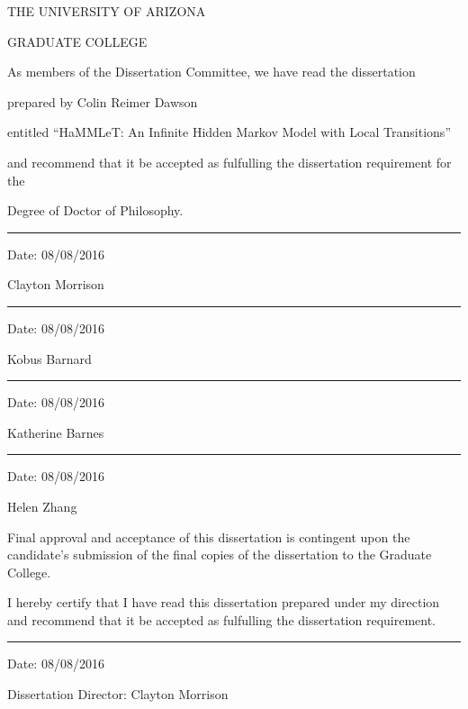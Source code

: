 \begin{center}
\MakeUppercase{The University of Arizona}

\MakeUppercase{Graduate College}

\end{center}

\begin{flushleft}
\begin{singlespace}
As members of the Dissertation Committee, we have read the dissertation

\vspace{0.25in}

prepared by Colin Reimer Dawson

\vspace{0.25in}

entitled ``HaMMLeT: An Infinite Hidden Markov Model with Local Transitions''

\vspace{0.25in}

and recommend that it be accepted as fulfulling the dissertation requirement for the

\vspace{0.25in}

Degree of Doctor of Philosophy.

\vspace{0.25in}

\rule{4in}{1pt} Date: 08/08/2016

Clayton Morrison

\vspace{0.25in}

\rule{4in}{1pt} Date: 08/08/2016

Kobus Barnard

\vspace{0.25in}

\rule{4in}{1pt} Date: 08/08/2016

Katherine Barnes

\vspace{0.25in}

\rule{4in}{1pt} Date: 08/08/2016

Helen Zhang

\vspace{0.25in}

Final approval and acceptance of this dissertation is contingent upon the candidate's submission of the final copies of the dissertation to the Graduate College.

\vspace{0.25in}

I hereby certify that I have read this dissertation prepared under my direction and recommend that it be accepted as fulfulling the dissertation requirement.

\vspace{0.25in}

\rule{4in}{1pt} Date: 08/08/2016

Dissertation Director: Clayton Morrison




\vspace{0.25in}

\end{singlespace}
\end{flushleft}




